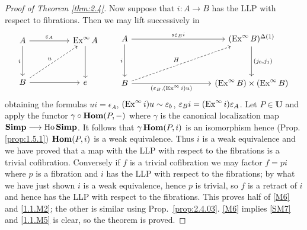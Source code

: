 \documentclass[../main]{subfiles}
\begin{document}
\begin{proof}[Proof of Theorem \ref{thm:2.4}]
Now suppose that $i \colon A \longrightarrow B$ has the LLP with respect to fibrations. Then we may lift successively in 
\[
\begin{tikzcd}
    A
    \arrow[rr, "\epsilon_A"]
    \arrow[dd, "i"']
    &&
    \Ex^\infty A
    \arrow[dd]
    \\\\
    B
    \arrow[rr]
    \arrow[uurr, dashed, "u"]
    &&
    e
\end{tikzcd}
\qquad
\begin{tikzcd}[column sep = huge]
    A
    \arrow[rr, "s\epsilon_B i"]
    \arrow[dd, "i"']
    &&
    (\Ex^\infty B)^{\Delta(1)}
    \arrow[dd, "{(j_0, j_1)}"]
    \\\\
    B
    \arrow[rr, "{(\epsilon_B, (\Ex^\infty i)u)}"']
    \arrow[uurr, dashed, "H"]
    &&
    (\Ex^\infty B) \times (\Ex^\infty B)
\end{tikzcd}
\]
obtaining the formulas $u i = \epsilon_A$, $(\operatorname{Ex}^\infty i) u \sim \varepsilon_b$, $\varepsilon_B i = (\operatorname{Ex}^\infty i) \varepsilon_A$. Let $P \in \mathbf{U}$  and apply the functor $\gamma \circ \operatorname{\mathbf{Hom}}(P,-)$ where $\gamma$ is the canonical localization map $\mathbf{Simp} \longrightarrow \operatorname{Ho} \mathbf{Simp}$. It follows that $\gamma \operatorname{\mathbf{Hom}}(P,i)$ is an isomorphism hence (Prop. \ref{prop:1.5.1}) $\operatorname{\mathbf{Hom}}(P, i)$ is a weak equivalence. Thus $i$ is a weak equivalence and we have proved that a map with the LLP with respect to the fibrations is a trivial cofibration. Conversely if $f$ is a trivial cofibration we may factor $f = pi$ where $p$ is a fibration and $i$ has the LLP with respect to the fibrations; by what we have just shown $i$ is a weak equivalence, hence $p$ is trivial, so $f$ is a retract of $i$ and hence has the LLP with respect to the fibrations. This proves half of \ref{M6} and \ref{1.1.M2}; the other is similar using Prop.\ \ref{prop:2.4.03}. \ref{M6}
implies \ref{SM7} and \ref{1.1.M5} is clear, so the theorem is proved.
\end{proof}
\end{document}
